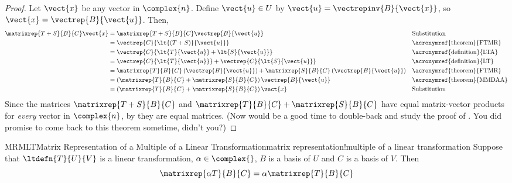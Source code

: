 \begin{proof}
Let $\vect{x}$ be any vector in $\complex{n}$.  Define $\vect{u}\in U$ by $\vect{u}=\vectrepinv{B}{\vect{x}}$, so $\vect{x}=\vectrep{B}{\vect{u}}$.  Then,
%
\begin{align*}
\matrixrep{T+S}{B}{C}\vect{x}&=
\matrixrep{T+S}{B}{C}\vectrep{B}{\vect{u}}&&\text{Substitution}\\
&=\vectrep{C}{\lt{\left(T+S\right)}{\vect{u}}}&&\text{\acronymref{theorem}{FTMR}}\\
&=\vectrep{C}{\lt{T}{\vect{u}}+\lt{S}{\vect{u}}}&&\text{\acronymref{definition}{LTA}}\\
&=\vectrep{C}{\lt{T}{\vect{u}}}+\vectrep{C}{\lt{S}{\vect{u}}}&&\text{\acronymref{definition}{LT}}\\
&=\matrixrep{T}{B}{C}\left(\vectrep{B}{\vect{u}}\right)+\matrixrep{S}{B}{C}\left(\vectrep{B}{\vect{u}}\right)&&\text{\acronymref{theorem}{FTMR}}\\
&=\left(\matrixrep{T}{B}{C}+\matrixrep{S}{B}{C}\right)\vectrep{B}{\vect{u}}&&\text{\acronymref{theorem}{MMDAA}}\\
&=\left(\matrixrep{T}{B}{C}+\matrixrep{S}{B}{C}\right)\vect{x}&&\text{Substitution}
\end{align*}
%
Since the matrices $\matrixrep{T+S}{B}{C}$ and $\matrixrep{T}{B}{C}+\matrixrep{S}{B}{C}$ have equal matrix-vector products for {\em every} vector in $\complex{n}$, by  they are equal matrices.  (Now would be a good time to double-back and study the proof of .  You did promise to come back to this theorem sometime, didn't you?)
%
\end{proof}
%
%
\begin{theorem}{MRMLT}{Matrix Representation of a Multiple of a Linear Transformation}{matrix representation!multiple of a linear transformation}
Suppose that $\ltdefn{T}{U}{V}$ is a linear transformation, $\alpha\in\complex{\null}$, $B$ is a basis of $U$ and $C$ is a basis of $V$.  Then
%
\begin{equation*}
\matrixrep{\alpha T}{B}{C}=\alpha\matrixrep{T}{B}{C}
\end{equation*}
%
\end{theorem}
%
